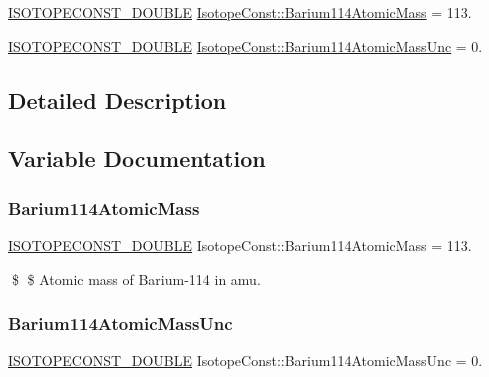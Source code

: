 \begin{DoxyCompactItemize}
\item 
\mbox{\hyperlink{group___isotope_const-_macros_ga8f45a7272ce02c0b4c65c44636ed719a}{I\+S\+O\+T\+O\+P\+E\+C\+O\+N\+S\+T\+\_\+\+D\+O\+U\+B\+LE}} \mbox{\hyperlink{group___isotope_const-_barium-_ba114_ga3b7b619f999d8600cc6bba838cc4d675}{Isotope\+Const\+::\+Barium114\+Atomic\+Mass}} = 113.
\item 
\mbox{\hyperlink{group___isotope_const-_macros_ga8f45a7272ce02c0b4c65c44636ed719a}{I\+S\+O\+T\+O\+P\+E\+C\+O\+N\+S\+T\+\_\+\+D\+O\+U\+B\+LE}} \mbox{\hyperlink{group___isotope_const-_barium-_ba114_ga16fcec8ee449a1d7ade12e4f71ce6593}{Isotope\+Const\+::\+Barium114\+Atomic\+Mass\+Unc}} = 0.
\end{DoxyCompactItemize}


\subsection{Detailed Description}


\subsection{Variable Documentation}
\mbox{\label{group___isotope_const-_barium-_ba114_ga3b7b619f999d8600cc6bba838cc4d675}} 
\subsubsection{\texorpdfstring{Barium114\+Atomic\+Mass}{Barium114AtomicMass}}
{\footnotesize\ttfamily \mbox{\hyperlink{group___isotope_const-_macros_ga8f45a7272ce02c0b4c65c44636ed719a}{I\+S\+O\+T\+O\+P\+E\+C\+O\+N\+S\+T\+\_\+\+D\+O\+U\+B\+LE}} Isotope\+Const\+::\+Barium114\+Atomic\+Mass = 113.}

\$ \$ Atomic mass of Barium-\/114 in amu. \mbox{\label{group___isotope_const-_barium-_ba114_ga16fcec8ee449a1d7ade12e4f71ce6593}} 
\subsubsection{\texorpdfstring{Barium114\+Atomic\+Mass\+Unc}{Barium114AtomicMassUnc}}
{\footnotesize\ttfamily \mbox{\hyperlink{group___isotope_const-_macros_ga8f45a7272ce02c0b4c65c44636ed719a}{I\+S\+O\+T\+O\+P\+E\+C\+O\+N\+S\+T\+\_\+\+D\+O\+U\+B\+LE}} Isotope\+Const\+::\+Barium114\+Atomic\+Mass\+Unc = 0.}

